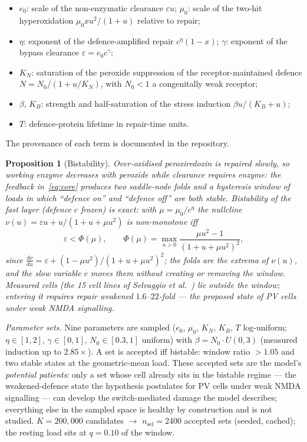 \documentclass[11pt,a4paper]{article}
\newtheorem{proposition}{Proposition}[section]
\theoremstyle{remark}
\begin{document}
\begin{itemize}
\item $e_0$: scale of the non-enzymatic clearance $\varepsilon u$; $\mu_0$: scale of
the two-hit hyperoxidation $\mu_0 xu^2/(1+u)$ relative to repair;
\item $\eta$: exponent of the defence-amplified repair $c^\eta(1-x)$; $\gamma$: exponent of
the bypass clearance $\varepsilon=e_0c^\gamma$;
\item $K_N$: saturation of the peroxide suppression of the receptor-maintained defence
$N=N_0/(1+u/K_N)$, with $N_0<1$ a congenitally weak receptor;
\item $\beta$, $K_B$: strength and half-saturation of the stress induction
$\beta u/(K_B+u)$;
\item $T$: defence-protein lifetime in repair-time units.
\end{itemize}
The provenance of each term is documented in the repository.

\begin{proposition}[Bistability]
Over-oxidised peroxiredoxin is repaired slowly, so working enzyme \emph{decreases} with
peroxide while clearance \emph{requires} enzyme: the feedback in~\eqref{eq:core}
produces two saddle-node folds and a hysteresis window of loads in which ``defence on''
and ``defence off'' are both stable. Bistability of the fast layer (defence $c$ frozen)
is exact: with $\mu=\mu_0/c^{\eta}$ the nullcline
$\nu(u)=\varepsilon u+u/(1+u+\mu u^2)$ is non-monotone iff
\begin{equation}\label{eq:phi}
\varepsilon<\Phi(\mu),\qquad
\Phi(\mu)=\max_{u>0}\frac{\mu u^2-1}{(1+u+\mu u^2)^2},
\end{equation}
since $\tfrac{d\nu}{du}=\varepsilon+(1-\mu u^2)/(1+u+\mu u^2)^2$; the folds are the
extrema of $\nu(u)$, and the slow variable $c$ moves them without creating or removing
the window. Measured cells (the 15 cell lines of Selvaggio et al.~\cite{selvaggio})
lie outside the window; entering it requires repair weakened $1.6$--$22$-fold --- the
proposed state of PV cells under weak NMDA signalling.
\end{proposition}


\emph{Parameter sets.} Nine parameters are sampled ($e_0$, $\mu_0$, $K_N$, $K_B$, $T$
log-uniform; $\eta\in[1,2]$, $\gamma\in[0,1]$, $N_0\in[0.3,1]$ uniform) with
$\beta=N_0\cdot U(0,3)$ (measured induction up to $2.85\times$). A set is accepted iff
bistable: window ratio $>1.05$ and two stable states at the geometric-mean load.
These accepted sets are the model's \emph{potential patients}: only a set whose cell
already sits in the bistable regime --- the weakened-defence state the hypothesis
postulates for PV cells under weak NMDA signalling --- can develop the switch-mediated
damage the model describes; everything else in the sampled space is healthy by
construction and is not studied.
$K=200{,}000$ candidates $\to$ $n_{\mathrm{sel}}=2400$ accepted sets (seeded, cached);
the resting load sits at $q=0.10$ of the window.
\end{document}
